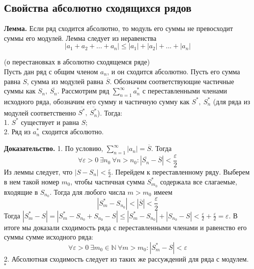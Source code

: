 \subsection{Свойства абсолютно сходящихся рядов}
\textbf{Лемма.} Если ряд сходится абсолютно, то модуль его суммы не 
превосходит суммы его модулей. Лемма следует из неравенства
$$\left| a_1+a_2+...+a_n \right|\leqslant |a_1|+|a_2|+...+|a_n|$$
\begin{theor} (о перестановках в абсолютно сходящемся ряде)\\
    Пусть дан ряд с общим членом $a_n$, и он сходится абсолютно.
    Пусть его сумма равна $S$, сумма из модулей равна $\overline{S}$. 
    Обозначим соответствующие частичные суммы как $S_n,~\overline{S_n}$.
    Рассмотрим ряд $\sum\limits_{n=1}^{\infty} a^*_n$ с переставленными
    членами исходного ряда, обозначим его сумму
    и частичную сумму как $S^*,~S^*_n$ (для ряда из модулей соответственно
    $\overline{S^*},~\overline{S^*_n}$). Тогда:\\
    1. $S^*$ существует и равна  $S$;\\
    2. Ряд из  $a^*_n$ сходится абсолютно.
    \end{theor}
\textbf{Доказательство.} 1.  
По условию, $\sum\limits_{n=1}^{\infty} |a_n|=\overline{S}$. Тогда
$$\forall \varepsilon>0~\exists n_0~\forall n>n_0:|\overline{S_n}-
\overline{S}|<\frac{\varepsilon}{2}$$ 
Из леммы следует, что $|S-S_n|<\frac{\varepsilon}{2}$. 
Перейдем к переставленному ряду. Выберем в нем такой номер $m_0$, 
чтобы частичная сумма $S^*_{m_0}$ содержала все слагаемые, входящие в 
$S_{n_0}$. Тогда для любого числа $m>m_0$ имеем
$$|S^*_{m}-S_{n_0}|<|\overline{S}|<\frac{\varepsilon}{2}$$
Тогда $|S^*_m-S|=|S^*_m-S_{n_0}+S_{n_0}-S|\leqslant 
|S^*_m-S_{n_0}|+|S_{n_0}-S|<\frac{\varepsilon}{2}+\frac{\varepsilon}{2}=
\varepsilon$. 
В итоге мы доказали сходимость ряда с переставленными членами и равенство 
его суммы сумме исходного ряда:
$$\forall \varepsilon>0~\exists m_0\in\mathbb{N}~\forall m>m_0:|S^*_m-S|
<\varepsilon$$ 
2. Абсолютная сходимость следует из таких же рассуждений для ряда с модулем. 
$\square$ 



